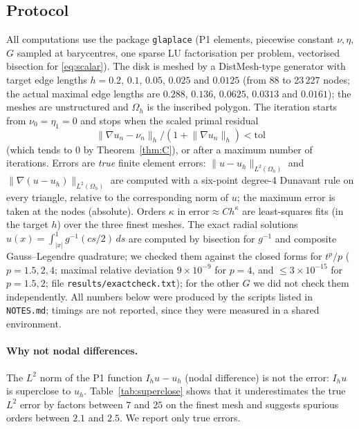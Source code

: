 \documentclass[11pt]{amsart}
\theoremstyle{definition}
\theoremstyle{remark}
\numberwithin{equation}{section}
\newcommand{\abs}[1]{\lvert #1\rvert}
\newcommand{\norm}[1]{\lVert #1\rVert}
\begin{document}
\subsection{Protocol}\label{ssec:protocol}
All computations use the package \texttt{glaplace} (P1 elements, piecewise constant $\nu,\eta$, $G$ sampled at barycentres, one sparse LU factorisation per problem, vectorised bisection for \eqref{eq:scalar}). The disk is meshed by a DistMesh-type generator with target edge lengths $h=0.2$, $0.1$, $0.05$, $0.025$ and $0.0125$ (from 88 to 23\,227 nodes; the actual maximal edge lengths are $0.288$, $0.136$, $0.0625$, $0.0313$ and $0.0161$); the meshes are unstructured and $\Omega_h$ is the inscribed polygon. The iteration starts from $\nu_0=\eta_1=0$ and stops when the scaled primal residual
\[
\norm{\nabla u_n-\nu_n}_h/(1+\norm{\nabla u_n}_h)<\mathrm{tol}
\]
(which tends to $0$ by Theorem~\ref{thm:C}), or after a maximum number of iterations. Errors are \emph{true} finite element errors: $\norm{u-u_h}_{L^2(\Omega_h)}$ and $\norm{\nabla(u-u_h)}_{L^2(\Omega_h)}$ are computed with a six-point degree-4 Dunavant rule on every triangle, relative to the corresponding norm of $u$; the maximum error is taken at the nodes (absolute). Orders $\kappa$ in $\text{error}\approx Ch^\kappa$ are least-squares fits (in the target $h$) over the three finest meshes. The exact radial solutions $u(x)=\int_{\abs x}^1g^{-1}(cs/2)\,ds$ are computed by bisection for $g^{-1}$ and composite Gauss--Legendre quadrature; we checked them against the closed forms for $t^p/p$ ($p=1.5,2,4$; maximal relative deviation $9\times10^{-9}$ for $p=4$, and $\le3\times10^{-15}$ for $p=1.5,2$; file \texttt{results/exactcheck.txt}); for the other $G$ we did not check them independently. All numbers below were produced by the scripts listed in \texttt{NOTES.md}; timings are not reported, since they were measured in a shared environment.

\paragraph{Why not nodal differences.} The $L^2$ norm of the P1 function $I_hu-u_h$ (nodal difference) is not the error: $I_hu$ is superclose to $u_h$. Table~\ref{tab:superclose} shows that it underestimates the true $L^2$ error by factors between $7$ and $25$ on the finest mesh and suggests spurious orders between $2.1$ and $2.5$. We report only true errors.
\end{document}
